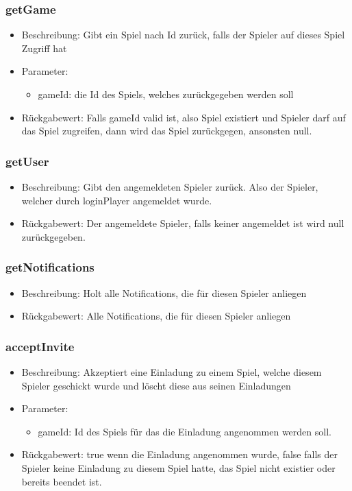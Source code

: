 \documentclass[a4paper]{scrreprt}
\begin{document}
    \subsubsection{getGame}
    \begin{itemize}
        \item Beschreibung: Gibt ein Spiel nach Id zurück, falls der Spieler auf dieses Spiel Zugriff hat
        \item Parameter:
        \begin{itemize}
            \item gameId: die Id des Spiels, welches zurückgegeben werden soll
        \end{itemize}
        \item Rückgabewert: Falls gameId valid ist, also Spiel existiert und Spieler darf auf das Spiel zugreifen, dann wird das Spiel zurückgegen, ansonsten null.
    \end{itemize}
    \subsubsection{getUser}
    \begin{itemize}
        \item Beschreibung: Gibt den angemeldeten Spieler zurück. Also der Spieler, welcher durch loginPlayer angemeldet wurde.
        \item Rückgabewert: Der angemeldete Spieler, falls keiner angemeldet ist wird null zurückgegeben.
    \end{itemize}

    \subsubsection{getNotifications}
    \begin{itemize}
        \item Beschreibung: Holt alle Notifications, die für diesen Spieler anliegen
        \item Rückgabewert:  Alle Notifications, die für diesen Spieler anliegen
    \end{itemize}
    \subsubsection{acceptInvite}
    \begin{itemize}
        \item Beschreibung: Akzeptiert eine Einladung zu einem Spiel, welche diesem Spieler geschickt wurde und löscht diese aus seinen Einladungen
        \item Parameter:
        \begin{itemize}
            \item gameId: Id des Spiels für das die Einladung angenommen werden soll.
        \end{itemize}
        \item Rückgabewert: true wenn die Einladung angenommen wurde, false falls der Spieler keine Einladung zu diesem Spiel hatte, das Spiel nicht existier oder bereits beendet ist.
    \end{itemize}
\end{document}
